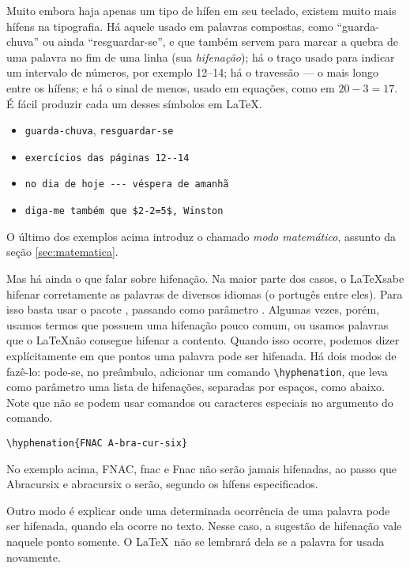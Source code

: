 Muito embora haja apenas um tipo de hífen em seu teclado, existem
muito mais hífens na tipografia. Há aquele usado em palavras
compostas, como ``guarda-chuva'' ou ainda ``resguardar-se'', e que também
servem para marcar a quebra de uma palavra no fim de uma linha
(sua \emph{hifenação}); há o traço usado para indicar um intervalo de números,
por exemplo 12--14; há o travessão --- o mais longo entre os hífens; e
há o sinal de menos, usado em equações, como em $20-3=17$. É fácil
produzir cada um desses símbolos em \LaTeX.

\begin{itemize}\footnotesize
\item \verb'guarda-chuva', \verb'resguardar-se'
\item \verb'exercícios das páginas 12--14' 
\item \verb'no dia de hoje --- véspera de amanhã'
\item \verb'diga-me também que $2-2=5$, Winston'
\end{itemize}

O último dos exemplos acima introduz o chamado \emph{modo
  matemático}, assunto da seção
\ref{sec:matematica}.

Mas há ainda o que falar sobre hifenação. Na maior parte dos casos, o
\LaTeX sabe hifenar corretamente as palavras de diversos idiomas (o
portugês entre eles). Para isso basta usar o pacote ,
passando como parâmetro . Algumas vezes, porém,
usamos termos que possuem uma hifenação pouco comum, ou usamos
palavras que o \LaTeX não consegue hifenar a contento. Quando isso
ocorre, podemos dizer explícitamente em que pontos uma palavra pode
ser hifenada. Há dois modos de fazê-lo: pode-se, no preâmbulo,
adicionar um comando \verb'\hyphenation', que leva como parâmetro uma
lista de hifenações, separadas por espaços, como abaixo. Note que não
se podem usar comandos ou caracteres especiais no argumento do comando. 

\begin{center}
  \verb'\hyphenation{FNAC A-bra-cur-six}'
\end{center}

No exemplo acima, FNAC, fnac e Fnac não serão jamais hifenadas, ao
passo que Abracursix e abracursix o serão, segundo os hífens
especificados.

Outro modo é explicar onde uma determinada ocorrência de uma palavra
pode ser hifenada, quando ela ocorre no texto. Nesse caso, a sugestão
de hifenação vale naquele ponto somente. O \LaTeX\ não se lembrará
dela se a palavra for usada novamente.

